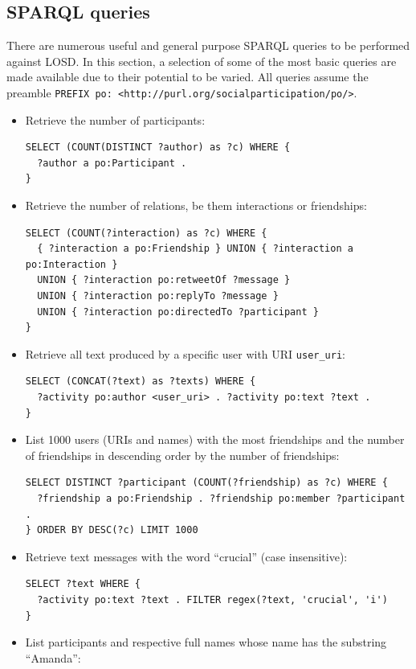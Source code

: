 \documentclass[data,datadescriptor,submit,moreauthors,pdftex]{Definitions/mdpi}
\newcommand{\textttt}[1] {\texttt{\footnotesize#1}}
\begin{document}
\subsection{SPARQL queries}\label{queries}
There are numerous useful and general purpose SPARQL queries to be performed against LOSD.
In this section, a selection of some of the most basic queries are made available due to their potential to be varied.
All queries assume the preamble \textttt{PREFIX po: <http://purl.org/socialparticipation/po/>}.
\begin{itemize}
  \item Retrieve the number of participants:
\begin{lstlisting}[language=spq]
SELECT (COUNT(DISTINCT ?author) as ?c) WHERE {
  ?author a po:Participant . 
}
\end{lstlisting}
  \item Retrieve the number of relations, be them interactions or
      friendships:
\begin{lstlisting}[language=spq]
SELECT (COUNT(?interaction) as ?c) WHERE {
  { ?interaction a po:Friendship } UNION { ?interaction a po:Interaction }
  UNION { ?interaction po:retweetOf ?message }
  UNION { ?interaction po:replyTo ?message }
  UNION { ?interaction po:directedTo ?participant }
}
\end{lstlisting}
            \item Retrieve all text produced by a specific user with URI \textttt{user\_uri}:
\begin{lstlisting}[language=spq]
SELECT (CONCAT(?text) as ?texts) WHERE {
  ?activity po:author <user_uri> . ?activity po:text ?text .
}
\end{lstlisting}
  \item List 1000 users (URIs and names) with the most friendships and the number of
      friendships in descending order by the number of friendships:
\begin{lstlisting}[language=spq]
SELECT DISTINCT ?participant (COUNT(?friendship) as ?c) WHERE {
  ?friendship a po:Friendship . ?friendship po:member ?participant . 
} ORDER BY DESC(?c) LIMIT 1000
\end{lstlisting}
  \item Retrieve text messages with the word ``crucial'' (case insensitive):
\begin{lstlisting}[language=spq]
SELECT ?text WHERE { 
  ?activity po:text ?text . FILTER regex(?text, 'crucial', 'i')
}
\end{lstlisting}
  \item List participants and respective full names whose name has the substring ``Amanda'':

\end{itemize}
\end{document}

